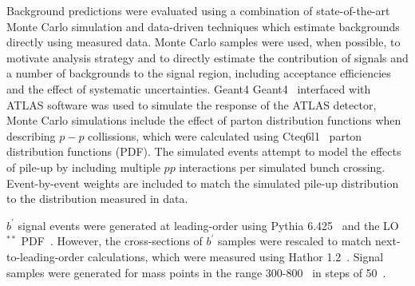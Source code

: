 Background predictions were evaluated using a combination of state-of-the-art Monte Carlo simulation and data-driven techniques which estimate backgrounds directly using measured data.
Monte Carlo samples were used, when possible, to motivate analysis strategy and to directly estimate the contribution of signals and a number of backgrounds to the signal region, including acceptance efficiencies and the effect of systematic uncertainties.
Geant4 {\sc Geant4}~\cite{Agostinelli:2002hh} interfaced with ATLAS software was used to simulate the response of the ATLAS detector,
Monte Carlo simulations include the effect of parton distribution functions when describing $p-p$ collissions, which were calculated using {\sc Cteq6l1}~\cite{Pumplin:2002vw} parton distribution functions (PDF).
The simulated events attempt to model the effects of pile-up by including multiple $pp$ interactions per simulated bunch crossing.
Event-by-event weights are included to match the simulated pile-up distribution to the distribution measured in data.


$b^\prime$ signal events were generated at leading-order using {\sc Pythia 6.425}~\cite{PYTHIA6.4} and the LO$^{**}$ PDF~\cite{Sherstnev:2008dm}.
However, the cross-sections of $b^\prime$ samples were rescaled to match next-to-leading-order calculations, which were measured using {\sc Hathor} 1.2~\cite{Aliev:2010gj}.
Signal samples were generated for mass points in the range 300-800~\GeV{} in steps of 50~\GeV{}.


